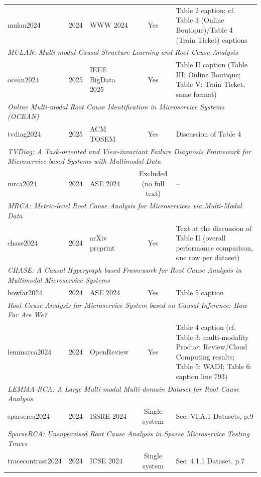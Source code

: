 {\begin{longtable}{lllcp{5.2cm}}
mulan2024 & 2024 & WWW 2024 & Yes & Table 2 caption; cf. Table 3 (Online Boutique)/Table 4 (Train Ticket) captions \\
\multicolumn{5}{l}{\scriptsize\textit{MULAN: Multi-modal Causal Structure Learning and Root Cause Analysis}} \\
ocean2024 & 2025 & IEEE BigData 2025 & Yes & Table II caption (Table III: Online Boutique; Table V: Train Ticket, same format) \\
\multicolumn{5}{l}{\scriptsize\textit{Online Multi-modal Root Cause Identification in Microservice Systems (OCEAN)}} \\
tvdiag2024 & 2025 & ACM TOSEM & Yes & Discussion of Table 4 \\
\multicolumn{5}{l}{\scriptsize\textit{TVDiag: A Task-oriented and View-invariant Failure Diagnosis Framework for Microservice-based Systems with Multimodal Data}} \\
mrca2024 & 2024 & ASE 2024 & Excluded (no full text) & -- \\
\multicolumn{5}{l}{\scriptsize\textit{MRCA: Metric-level Root Cause Analysis for Microservices via Multi-Modal Data}} \\
chase2024 & 2024 & arXiv preprint & Yes & Text at the discussion of Table II (overall performance comparison, one row per dataset) \\
\multicolumn{5}{l}{\scriptsize\textit{CHASE: A Causal Hypergraph based Framework for Root Cause Analysis in Multimodal Microservice Systems}} \\
howfar2024 & 2024 & ASE 2024 & Yes & Table 5 caption \\
\multicolumn{5}{l}{\scriptsize\textit{Root Cause Analysis for Microservice System based on Causal Inference: How Far Are We?}} \\
lemmarca2024 & 2024 & OpenReview & Yes & Table 4 caption (cf. Table 3: multi-modality Product Review/Cloud Computing results; Table 5: WADI; Table 6: caption line 793) \\
\multicolumn{5}{l}{\scriptsize\textit{LEMMA-RCA: A Large Multi-modal Multi-domain Dataset for Root Cause Analysis}} \\
sparserca2024 & 2024 & ISSRE 2024 & Single system & Sec. VI.A.1 Datasets, p.9 \\
\multicolumn{5}{l}{\scriptsize\textit{SparseRCA: Unsupervised Root Cause Analysis in Sparse Microservice Testing Traces}} \\
tracecontrast2024 & 2024 & ICSE 2024 & Single system & Sec. 4.1.1 Dataset, p.7 \\

\end{longtable}}
